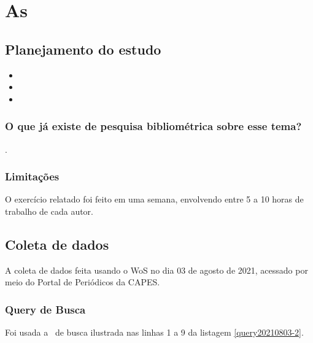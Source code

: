 \chapter{As\label{chap:bibliometria:}}

\section{Planejamento do estudo\label{}}


\begin{itemize}
    \item 
    \item 
    \item 
\end{itemize}

\subsection{O que já existe de pesquisa bibliométrica sobre esse tema?}

\cite{} 
\cite{}.


\subsection{Limitações} O exercício relatado foi feito em uma semana, envolvendo entre 5 a 10 horas de trabalho de cada autor.

\section{Coleta de dados\label{MASSA:coleta}}

A coleta de dados feita usando o WoS no dia 03 de agosto de 2021, acessado por meio do Portal de Periódicos da CAPES.


\subsection{Query de Busca}

Foi usada a \query\  de busca ilustrada nas linhas 1 a 9 da listagem \ref{query20210803-2}.


